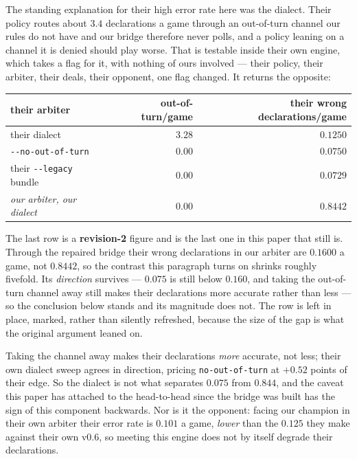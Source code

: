 \documentclass[11pt,letterpaper]{article}
\begin{document}
The standing explanation for their high error rate here was the dialect. Their
policy routes about $3.4$ declarations a game through an out-of-turn channel
our rules do not have and our bridge therefore never polls, and a policy leaning
on a channel it is denied should play worse. That is testable inside their own
engine, which takes a flag for it, with nothing of ours involved --- their
policy, their arbiter, their deals, their opponent, one flag changed. It returns
the opposite:

\begin{center}
\small
\begin{tabular}{lrr}
\toprule
their arbiter & out-of-turn/game & their wrong declarations/game \\
\midrule
their dialect & $3.28$ & $0.1250$ \\
\texttt{-{}-no-out-of-turn} & $0.00$ & $\mathbf{0.0750}$ \\
their \texttt{-{}-legacy} bundle & $0.00$ & $0.0729$ \\
\midrule
\emph{our arbiter, our dialect} & $0.00$ & $\mathbf{0.8442}$ \\
\bottomrule
\end{tabular}
\end{center}

\noindent The last row is a \textbf{revision-2} figure and is the last one in
this paper that still is. Through the repaired bridge their wrong declarations
in our arbiter are $0.1600$ a game, not $0.8442$, so the contrast this
paragraph turns on shrinks roughly fivefold. Its \emph{direction} survives ---
$0.075$ is still below $0.160$, and taking the out-of-turn channel away still
makes their declarations more accurate rather than less --- so the conclusion
below stands and its magnitude does not. The row is left in place, marked,
rather than silently refreshed, because the size of the gap is what the
original argument leaned on.

\noindent Taking the channel away makes their declarations \emph{more}
accurate, not less; their own dialect sweep agrees in direction, pricing
\texttt{no-out-of-turn} at $+0.52$ points of their edge. So the dialect is not
what separates $0.075$ from $0.844$, and the caveat this paper has attached to
the head-to-head since the bridge was built has the sign of this component
backwards. Nor is it the opponent: facing our champion in their own arbiter
their error rate is $0.101$ a game, \emph{lower} than the $0.125$ they make
against their own v0.6, so meeting this engine does not by itself degrade their
declarations.
\end{document}
